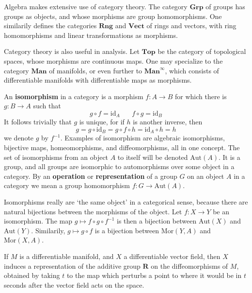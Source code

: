 \begin{example}
    Algebra makes extensive use of category theory. The category $\mathbf{Grp}$ of groups has groups as objects, and whose morphisms are group homomorphisms. One similarily defines the categories $\mathbf{Rng}$ and $\mathbf{Vect}$ of rings and vectors, with ring homomorphisms and linear transformations as morphisms.
\end{example}

\begin{example}
    Category theory is also useful in analysis. Let $\mathbf{Top}$ be the category of topological spaces, whose morphisms are continuous maps. One may specialize to the category $\mathbf{Man}$ of manifolds, or even further to $\mathbf{Man}^\infty$, which consists of differentiable manifolds with differentiable maps as morphisms.
\end{example}

An {\bf isomorphism} in a category is a morphism $f:A \to B$ for which there is $g: B \to A$ such that
%
\[ g \circ f = \text{id}_A\ \ \ \ \ \ \ \ f \circ g = \text{id}_B \]
%
It follows trivially that $g$ is unique, for if $h$ is another inverse, then
%
\[ g = g \circ \text{id}_B = g \circ f \circ h = \text{id}_A \circ h = h \]
%
we denote $g$ by $f^{-1}$. Examples of isomorphism are algebraic isomorphisms, bijective maps, homeomorphisms, and diffeomorphisms, all in one concept. The set of isomorphisms from an object $A$ to itself will be denoted $\text{Aut}(A)$. It is a group, and all groups are isomorphic to automorphisms over some object in a category. By an {\bf operation} or {\bf representation} of a group $G$ on an object $A$ in a category we mean a group homomorphism $f: G \to \text{Aut}(A)$.

Isomorphisms really are `the same object' in a categorical sense, because there are natural bijections between the morphisms of the object. Let $f: X \to Y$ be an isomorphism. The map $g \mapsto f \circ g \circ f^{-1}$ is then a bijection between $\text{Aut}(X)$ and $\text{Aut}(Y)$. Similarily, $g \mapsto g \circ f$ is a bijection between $\text{Mor}(Y,A)$ and $\text{Mor}(X,A)$.

\begin{example}
    If $M$ is a differentiable manifold, and $X$ a differentiable vector field, then $X$ induces a representation of the additive group $\mathbf{R}$ on the diffeomorphisms of $M$, obtained by taking $t$ to the map which perturbs a point to where it would be in $t$ seconds after the vector field acts on the space.
\end{example}

